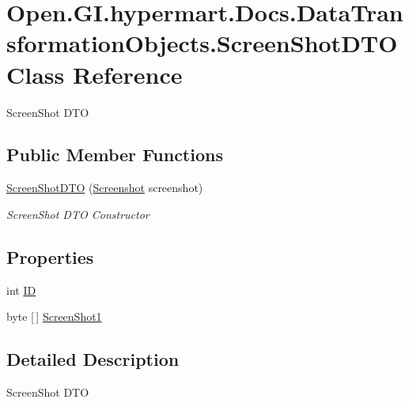 \hypertarget{class_open_1_1_g_i_1_1hypermart_1_1_docs_1_1_data_transformation_objects_1_1_screen_shot_d_t_o}{}\section{Open.\+G\+I.\+hypermart.\+Docs.\+Data\+Transformation\+Objects.\+Screen\+Shot\+D\+TO Class Reference}
\label{class_open_1_1_g_i_1_1hypermart_1_1_docs_1_1_data_transformation_objects_1_1_screen_shot_d_t_o}


Screen\+Shot D\+TO  


\subsection*{Public Member Functions}
\begin{DoxyCompactItemize}
\item 
\hyperlink{class_open_1_1_g_i_1_1hypermart_1_1_docs_1_1_data_transformation_objects_1_1_screen_shot_d_t_o_a1d16d059ad949737184bd5b8061d036d}{Screen\+Shot\+D\+TO} (\hyperlink{class_open_1_1_g_i_1_1hypermart_1_1_models_1_1_screenshot}{Screenshot} screenshot)
\begin{DoxyCompactList}\small\item\em Screen\+Shot D\+TO Constructor \end{DoxyCompactList}\end{DoxyCompactItemize}
\subsection*{Properties}
\begin{DoxyCompactItemize}
\item 
int \hyperlink{class_open_1_1_g_i_1_1hypermart_1_1_docs_1_1_data_transformation_objects_1_1_screen_shot_d_t_o_ae97d094ea2ba7b786d2fd171b12cc3e6}{ID}
\item 
byte \mbox{[}$\,$\mbox{]} \hyperlink{class_open_1_1_g_i_1_1hypermart_1_1_docs_1_1_data_transformation_objects_1_1_screen_shot_d_t_o_af8a951a853f5107194edf4f3fe9168a8}{Screen\+Shot1}
\end{DoxyCompactItemize}


\subsection{Detailed Description}
Screen\+Shot D\+TO 



